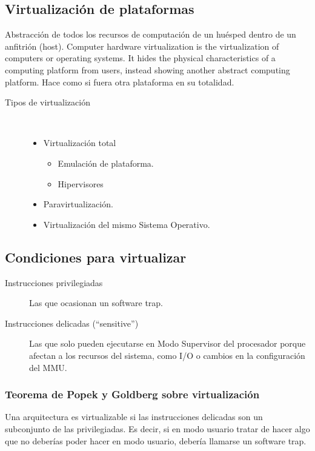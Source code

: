 \documentclass[a4paper, twoside]{article}
\begin{document}
\subsection{Virtualización de plataformas}
Abstracción de todos los recursos de computación de un huésped dentro de un anfitrión (host). Computer hardware virtualization is the virtualization of computers or operating systems. It hides the physical characteristics of a computing platform from users, instead showing another abstract computing platform. Hace como si fuera otra plataforma en su totalidad.

\begin{description}
	\item[Tipos de virtualización] ~
	\begin{itemize}
		\item Virtualización total
		\begin{itemize}
			\item Emulación de plataforma.
			\item Hipervisores
		\end{itemize}
		\item Paravirtualización.
		\item Virtualización del mismo Sistema Operativo.
	\end{itemize}
\end{description}

\subsection{Condiciones para virtualizar}
\begin{description}
	\item[Instrucciones privilegiadas] Las que ocasionan un software trap.
	\item[Instrucciones delicadas (``sensitive'')] Las que solo pueden ejecutarse en Modo Supervisor del procesador porque afectan a los recursos del sistema, como I/O o cambios en la configuración del MMU.
\end{description}

\subsubsection{Teorema de Popek y Goldberg sobre virtualización}
Una arquitectura es virtualizable si las instrucciones delicadas son un subconjunto de las privilegiadas. Es decir, si en modo usuario tratar de hacer algo que no deberías poder hacer en modo usuario, debería llamarse un software trap.
\end{document}
